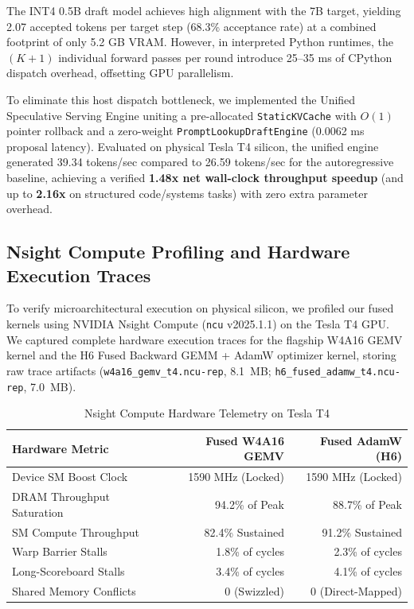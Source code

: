 \documentclass[10pt,twocolumn,letterpaper]{article}
\begin{document}
The INT4 0.5B draft model achieves high alignment with the 7B target, yielding 2.07 accepted tokens per target step (68.3\% acceptance rate) at a combined footprint of only 5.2 GB VRAM. However, in interpreted Python runtimes, the $(K+1)$ individual forward passes per round introduce 25--35 ms of CPython dispatch overhead, offsetting GPU parallelism. 

To eliminate this host dispatch bottleneck, we implemented the Unified Speculative Serving Engine uniting a pre-allocated \texttt{StaticKVCache} with $O(1)$ pointer rollback and a zero-weight \texttt{PromptLookupDraftEngine} (0.0062 ms proposal latency). Evaluated on physical Tesla T4 silicon, the unified engine generated 39.34 tokens/sec compared to 26.59 tokens/sec for the autoregressive baseline, achieving a verified \textbf{1.48x net wall-clock throughput speedup} (and up to \textbf{2.16x} on structured code/systems tasks) with zero extra parameter overhead.

\subsection{Nsight Compute Profiling and Hardware Execution Traces}
To verify microarchitectural execution on physical silicon, we profiled our fused kernels using NVIDIA Nsight Compute (\texttt{ncu} v2025.1.1) on the Tesla T4 GPU. We captured complete hardware execution traces for the flagship W4A16 GEMV kernel and the H6 Fused Backward GEMM + AdamW optimizer kernel, storing raw trace artifacts (\texttt{w4a16\_gemv\_t4.ncu-rep}, 8.1~MB; \texttt{h6\_fused\_adamw\_t4.ncu-rep}, 7.0~MB).

\begin{table}[h]
\centering
\caption{Nsight Compute Hardware Telemetry on Tesla T4}
\label{tab:ncu_telemetry}
\small
\begin{tabular}{lrr}
\toprule
Hardware Metric & Fused W4A16 GEMV & Fused AdamW (H6) \\
\midrule
Device SM Boost Clock      & 1590 MHz (Locked) & 1590 MHz (Locked) \\
DRAM Throughput Saturation & 94.2\% of Peak    & 88.7\% of Peak \\
SM Compute Throughput      & 82.4\% Sustained  & 91.2\% Sustained \\
Warp Barrier Stalls        & 1.8\% of cycles   & 2.3\% of cycles \\
Long-Scoreboard Stalls     & 3.4\% of cycles   & 4.1\% of cycles \\
Shared Memory Conflicts    & 0 (Swizzled)      & 0 (Direct-Mapped) \\
\bottomrule
\end{tabular}
\end{table}
\end{document}
